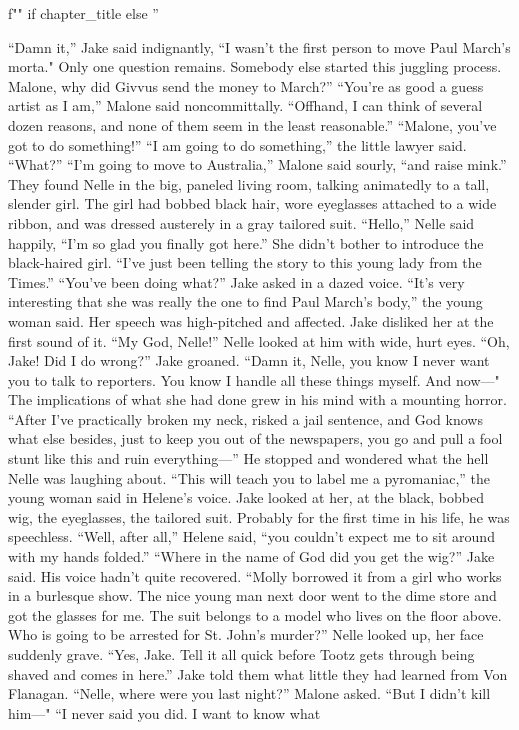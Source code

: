 \documentclass{novel}
\begin{document}
\begin{ChapterStart}
\vspace{3\nbs}
f"" if chapter_title else ''
\end{ChapterStart}

“Damn it,” Jake said indignantly, “I wasn’t the first person to move Paul March’s morta." Only one question remains. Somebody else started this juggling process. Malone, why did Givvus send the money to March?” “You’re as good a guess artist as I am,” Malone said noncommittally. “Offhand, I can think of several dozen reasons, and none of them seem in the least reasonable.” “Malone, you’ve got to do something!” “I am going to do something,” the little lawyer said. “What?” “I’m going to move to Australia,” Malone said sourly, “and raise mink.” They found Nelle in the big, paneled living room, talking animatedly to a tall, slender girl. The girl had bobbed black hair, wore eyeglasses attached to a wide ribbon, and was dressed austerely in a gray tailored suit. “Hello,” Nelle said happily, “I’m so glad you finally got here.” She didn’t bother to introduce the black-haired girl. “I've just been telling the story to this young lady from the Times.” “You’ve been doing what?” Jake asked in a dazed voice. “It’s very interesting that she was really the one to find Paul March’s body,” the young woman said. Her speech was high-pitched and affected. Jake disliked her at the first sound of it. “My God, Nelle!” Nelle looked at him with wide, hurt eyes. “Oh, Jake! Did I do wrong?” Jake groaned. “Damn it, Nelle, you know I never want you to talk to reporters. You know I handle all these things myself. And now—" The implications of what she had done grew in his mind with a mounting horror. “After I’ve practically broken my neck, risked a jail sentence, and God knows what else besides, just to keep you out of the newspapers, you go and pull a fool stunt like this and ruin everything—” He stopped and wondered what the hell Nelle was laughing about. “This will teach you to label me a pyromaniac,” the young woman said in Helene’s voice. Jake looked at her, at the black, bobbed wig, the eyeglasses, the tailored suit. Probably for the first time in his life, he was speechless. “Well, after all,” Helene said, “you couldn’t expect me to sit around with my hands folded.” “Where in the name of God did you get the wig?” Jake said. His voice hadn’t quite recovered. “Molly borrowed it from a girl who works in a burlesque show. The nice young man next door went to the dime store and got the glasses for me. The suit belongs to a model who lives on the floor above. Who is going to be arrested for St. John’s murder?” Nelle looked up, her face suddenly grave. “Yes, Jake. Tell it all quick before Tootz gets through being shaved and comes in here.” Jake told them what little they had learned from Von Flanagan. “Nelle, where were you last night?” Malone asked. “But I didn’t kill him—" “I never said you did. I want to know what 
\end{document}
